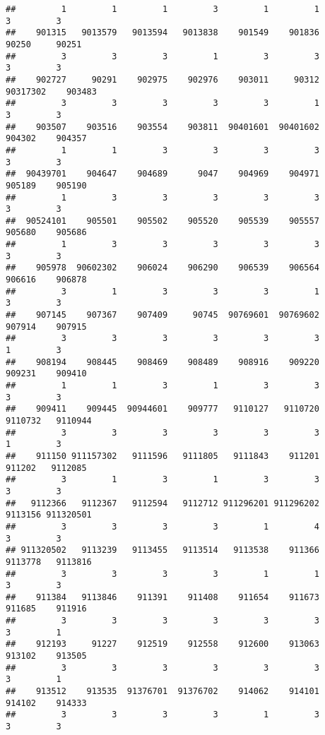 \documentclass[
]{article}
\begin{document}
\begin{verbatim}
##         1         1         1         3         1         1         3         3 
##    901315   9013579   9013594   9013838    901549    901836     90250     90251 
##         3         3         3         1         3         3         3         3 
##    902727     90291    902975    902976    903011     90312  90317302    903483 
##         3         3         3         3         3         1         3         3 
##    903507    903516    903554    903811  90401601  90401602    904302    904357 
##         1         1         3         3         3         3         3         3 
##  90439701    904647    904689      9047    904969    904971    905189    905190 
##         1         3         3         3         3         3         3         3 
##  90524101    905501    905502    905520    905539    905557    905680    905686 
##         1         3         3         3         3         3         3         3 
##    905978  90602302    906024    906290    906539    906564    906616    906878 
##         3         1         3         3         3         1         3         3 
##    907145    907367    907409     90745  90769601  90769602    907914    907915 
##         3         3         3         3         3         3         1         3 
##    908194    908445    908469    908489    908916    909220    909231    909410 
##         1         1         3         1         3         3         3         3 
##    909411    909445  90944601    909777   9110127   9110720   9110732   9110944 
##         3         3         3         3         3         3         1         3 
##    911150 911157302   9111596   9111805   9111843    911201    911202   9112085 
##         3         1         3         1         3         3         3         3 
##   9112366   9112367   9112594   9112712 911296201 911296202   9113156 911320501 
##         3         3         3         3         1         4         3         3 
## 911320502   9113239   9113455   9113514   9113538    911366   9113778   9113816 
##         3         3         3         3         1         1         3         3 
##    911384   9113846    911391    911408    911654    911673    911685    911916 
##         3         3         3         3         3         3         3         1 
##    912193     91227    912519    912558    912600    913063    913102    913505 
##         3         3         3         3         3         3         3         1 
##    913512    913535  91376701  91376702    914062    914101    914102    914333 
##         3         3         3         3         1         3         3         3 

\end{verbatim}
\end{document}

